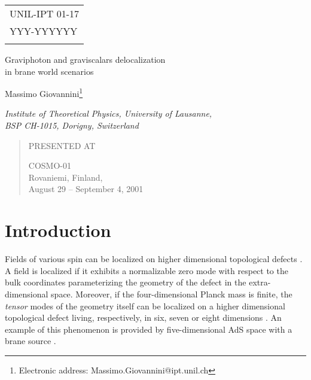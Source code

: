\documentclass[a4paper,12pt]{article}
\providecommand{\pubnumber}[1]{\begin{lrbox}{\sboxpubnumber}{\begin{tabular}{l}
#1 \\
				 \usebox{\sboxpubdate}
				 \end{tabular}}
                           \end{lrbox}
                           \pubblock}
\providecommand{\Title}[1]{\begin{center} {\Large #1 } \end{center}}
\providecommand{\Author}[1]{\begin{center}{ \sc #1} \end{center}}
\providecommand{\Address}[1]{\begin{center}{ \it #1} \end{center}}
\providecommand{\pubblock}{\rightline{
			\usebox{\sboxpubnumber}}}
\newenvironment{Presented}{\begin{quotation} \begin{center}
             PRESENTED AT\end{center}\bigskip
      \begin{center}\begin{large}}{\end{large}\end{center}
      \end{quotation}}
\begin{document}
\begin{titlepage}
\pubnumber{UNIL-IPT 01-17 \\ YYY-YYYYYY} %
\vfill
\Title{Graviphoton and graviscalars delocalization\\ in brane world
scenarios}
\vfill
\Author{Massimo Giovannini\footnote{Electronic address: 
Massimo.Giovannini@ipt.unil.ch}}
\Address{Institute of Theoretical Physics, University of Lausanne, \\
BSP CH-1015, Dorigny, Switzerland}
\vfill
\begin{abstract}
A manifestly gauge-invariant theory of gravitational fluctuations 
of brane-world scenarios is discussed. Without resorting 
to any specific gauge choice, a general method is presented 
in order to disentangle the fluctuations of the brane energy-momentum 
from the fluctuations of the metric.
As an application of the formalism, 
the localization  of metric fluctuations on scalar branes 
breaking spontaneously five-dimensional Poincar\'e invariance is addressed. 
Only assuming that the four-dimensional Planck mass is finite and that the
geometry is regular, it is demonstrated that the vector and scalar 
fluctuations of the metric are not localized on the brane. 
\end{abstract}
\begin{Presented}
    COSMO-01\\
    Rovaniemi, Finland, \\
    August 29 -- September 4, 2001
\end{Presented}
\vfill
\end{titlepage}
\def\thefootnote{\fnsymbol{footnote}}
\setcounter{footnote}{0}

\renewcommand{\theequation}{1.\arabic{equation}}
\setcounter{equation}{0}
\section{Introduction}
Fields of various spin can be localized \cite{m1} on higher dimensional 
topological defects \cite{m2,ak,vis}. A field is localized if 
it exhibits a normalizable zero mode with respect 
to the bulk coordinates parameterizing the geometry of 
the defect in the extra-dimensional space. 
Moreover, if the four-dimensional Planck mass is finite, the 
{\em tensor} modes of the geometry itself can be localized 
on a higher dimensional topological defect living, respectively, 
in six, seven or eight dimensions \cite{misproc}. An 
example of this phenomenon is provided 
by five-dimensional AdS space with a brane source \cite{rs,rs2}.
\end{document}

